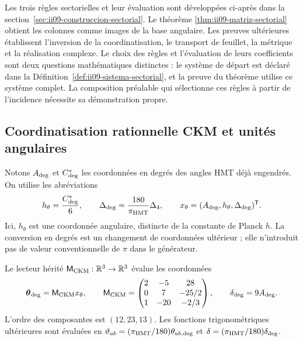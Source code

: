 \begin{remark}
Les trois règles sectorielles et leur évaluation sont développées ci-après
dans la section~\ref{sec:ii09-construccion-sectorial}. Le théorème
\ref{thm:ii09-matriz-sectorial} obtient les colonnes comme images de la
base angulaire. Les preuves ultérieures établissent l’inversion de la coordinatisation,
le transport de feuillet, la métrique et la réalisation complexe.
Le choix des règles et l’évaluation de leurs coefficients sont deux
questions mathématiques distinctes : le système de départ est déclaré dans la
Définition~\ref{def:ii09-sistema-sectorial}, et la preuve du théorème
utilise ce système complet. La composition préalable qui sélectionne ces
règles à partir de l’incidence nécessite sa démonstration propre.
\end{remark}



\subsection{Coordinatisation rationnelle CKM et unités angulaires}

Notons \(A_{\rm deg}\) et \(C^*_{\rm deg}\) les coordonnées en
degrés des angles HMT déjà engendrés. On utilise les abréviations
\begin{equation}
 h_\theta=\frac{C^*_{\rm deg}}6,
 \qquad
 \Delta_{\rm deg}=\frac{180}{\pi_{\rm HMT}}\Delta_4,
 \qquad
 x_\theta=(A_{\rm deg},h_\theta,\Delta_{\rm deg})^{\mathsf T}.
 \label{eq:ii-angular-chart}
\end{equation}
Ici, \(h_\theta\) est une coordonnée angulaire, distincte de la constante de
Planck \(h\). La conversion en degrés est un changement de coordonnées ultérieur ; elle
n’introduit pas de valeur conventionnelle de \(\pi\) dans le générateur.

\begin{definition}
Le lecteur hérité \(\mathsf M_{\rm CKM}:\mathbb R^3\to\mathbb R^3\)
évalue les coordonnées
\begin{equation}
 \boldsymbol\theta_{\rm deg}=\mathsf M_{\rm CKM}x_\theta,
 \qquad
 \mathsf M_{\rm CKM}=
 \begin{pmatrix}
 2&-5&28\\
 0&7&-25/2\\
 1&-20&-2/3
 \end{pmatrix},
 \qquad
 \delta_{\rm deg}=9A_{\rm deg}.
 \label{eq:ii-ckm-map}
\end{equation}
L'ordre des composantes est \((12,23,13)\). Les fonctions
trigonométriques ultérieures sont évaluées en
\(\vartheta_{ab}=(\pi_{\rm HMT}/180)\theta_{ab,\rm deg}\) et
\(\delta=(\pi_{\rm HMT}/180)\delta_{\rm deg}\).
\end{definition}

